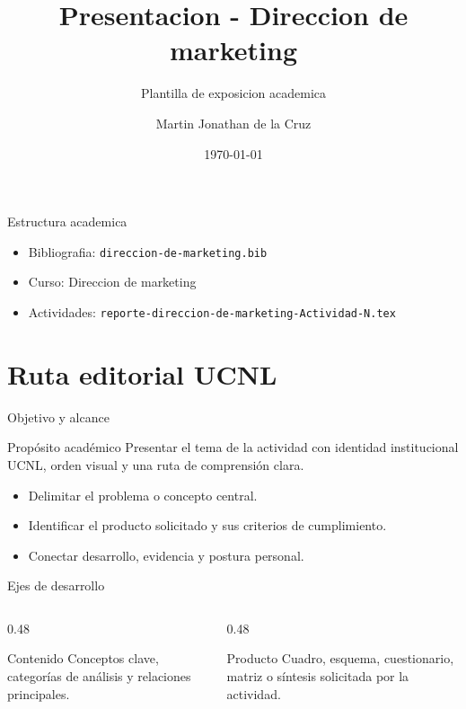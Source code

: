 ﻿\documentclass[spanish,aspectratio=169]{beamer}
\title{Presentacion - Direccion de marketing}
\subtitle{Plantilla de exposicion academica}
\author{Martin Jonathan de la Cruz}
\institute{Universidad Ciudadana de Nuevo Leon}
\date{\today}
\begin{document}
\begin{frame}
  \titlepage
\end{frame}

\begin{frame}{Estructura academica}
  \begin{itemize}
    \item Bibliografia: \texttt{direccion-de-marketing.bib}
    \item Curso: Direccion de marketing
    \item Actividades: \texttt{reporte-direccion-de-marketing-Actividad-N.tex}
  \end{itemize}
\end{frame}


\section{Ruta editorial UCNL}

\begin{frame}{Objetivo y alcance}
  \begin{block}{Propósito académico}
    Presentar el tema de la actividad con identidad institucional UCNL, orden visual y una ruta de comprensión clara.
  \end{block}
  \begin{itemize}
    \item Delimitar el problema o concepto central.
    \item Identificar el producto solicitado y sus criterios de cumplimiento.
    \item Conectar desarrollo, evidencia y postura personal.
  \end{itemize}
\end{frame}

\begin{frame}{Ejes de desarrollo}
  \begin{columns}[T,totalwidth=\textwidth]
    \begin{column}{0.48\textwidth}
      \begin{block}{Contenido}
        Conceptos clave, categorías de análisis y relaciones principales.
      \end{block}
    \end{column}
    \begin{column}{0.48\textwidth}
      \begin{block}{Producto}
        Cuadro, esquema, cuestionario, matriz o síntesis solicitada por la actividad.
      \end{block}
    \end{column}
  \end{columns}
\end{frame}
\end{document}
